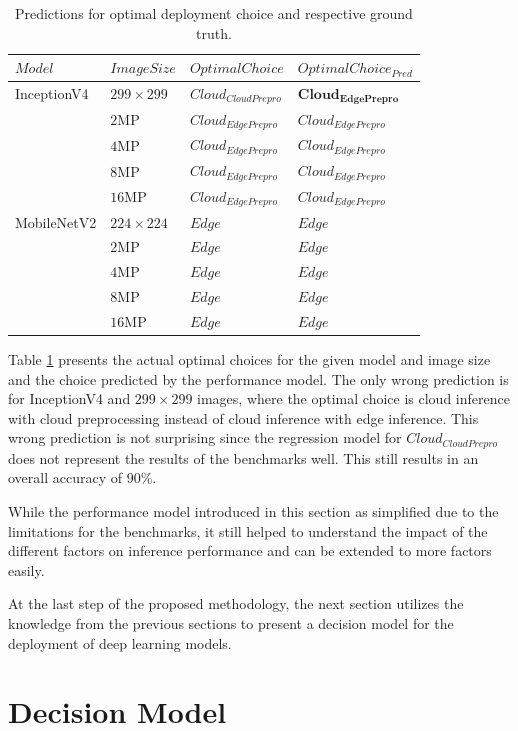 \begin{table}[!htb]
\centering
\caption{Predictions for optimal deployment choice and respective ground truth.}
\label{table:perfmofelpred}
\begin{tabular}{@{}llll@{}}
\toprule
$Model$ & $ImageSize$ & $OptimalChoice$ & $OptimalChoice_{Pred}$ \\ \midrule
InceptionV4 & $299\times299$ & $Cloud_{CloudPrepro}$ & $\mathbf{Cloud_{EdgePrepro}}$ \\
 & $2$MP & $Cloud_{EdgePrepro}$ & $Cloud_{EdgePrepro}$ \\
 & $4$MP & $Cloud_{EdgePrepro}$ & $Cloud_{EdgePrepro}$ \\
 & $8$MP & $Cloud_{EdgePrepro}$ & $Cloud_{EdgePrepro}$ \\
 & $16$MP & $Cloud_{EdgePrepro}$ & $Cloud_{EdgePrepro}$ \\
MobileNetV2 & $224\times224$ & $Edge$ & $Edge$ \\
 & $2$MP & $Edge$ & $Edge$ \\
 & $4$MP & $Edge$ & $Edge$ \\
 & $8$MP & $Edge$ & $Edge$ \\ 
 & $16$MP & $Edge$ & $Edge$ \\ \bottomrule
\end{tabular}
\end{table}


Table \ref{table:perfmofelpred} presents the actual optimal choices for the given model and image size and the choice predicted by the performance model.
The only wrong prediction is for InceptionV4 and $299\times299$ images, where the optimal choice is cloud inference with cloud preprocessing instead of cloud inference with edge inference.
This wrong prediction is not surprising since the regression model for $Cloud_{CloudPrepro}$ does not represent the results of the benchmarks well.
This still results in an overall accuracy of $90\%$.


While the performance model introduced in this section as simplified due to the limitations for the benchmarks, it still helped to understand the impact of the different factors on inference performance and can be extended to more factors easily.

At the last step of the proposed methodology, the next section utilizes the knowledge from the previous sections to present a decision model for the deployment of deep learning models.


\FloatBarrier
\section{Decision Model}\label{chap:DecisionModel}

